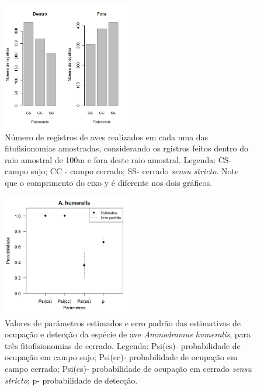 \documentclass[12pt, A4]{article}
\begin{document}
\begin{figure}
  \centering
\includegraphics[width=0.5\textwidth]{figures/reg_fito/reg_fito.jpg}
  \caption{Número de registros de aves realizados em cada uma das fitofisionomias amostradas, considerando os rgistros feitos dentro do raio amostral de 100m e fora deste raio amostral. Legenda: CS- campo sujo; CC -  campo cerrado; SS- cerrado \textit{sensu stricto}. Note que o comprimento do eixo y é diferente nos dois gráficos.}
  \label{fig:aves2} 
\end{figure}

\begin{figure}
  \centering
\includegraphics[width=0.5\textwidth]{figures/ocupacao/ocupacao.jpg}
  \caption{Valores de parâmetros estimados e erro padrão das estimativas de ocupação e detecção da espécie de ave \textit{Ammodramus humeralis}, para três fitofisionomias de cerrado. Legenda: Psi(cs)- probabilidade de ocupação em campo sujo; Psi(cc)- probabilidade de ocupação em campo cerrado; Psi(cs)- probabilidade de ocupação em cerrado \textit{sensu stricto}; p- probabilidade de detecção.}
  \label{fig:aves5} 
\end{figure}
\end{document}
